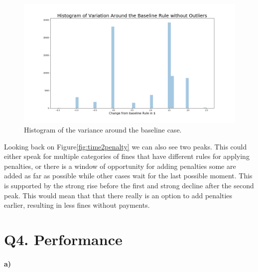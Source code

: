 \documentclass[12pt]{report}
\begin{document}
\begin{figure}[H]
  \centering
  \includegraphics[width=\textwidth]{figures/baselineVar.png}
  \caption{Histogram of the variance around the baseline case.}
  \label{fig:baselineVar}
\end{figure}

Looking back on Figure\ref{fig:time2penalty} we can also see two peaks. This could either speak for multiple categories of fines that have different rules for applying penalties, or there is a window of opportunity for adding penalties some are added as far as possible while other cases wait for the last possible moment. This is supported by the strong rise before the first and strong decline after the second peak. This would mean that that there really is an option to add penalties earlier, resulting in less fines without payments.

\section{Q4. Performance}

\paragraph{\textbf{a)}}
\end{document}
